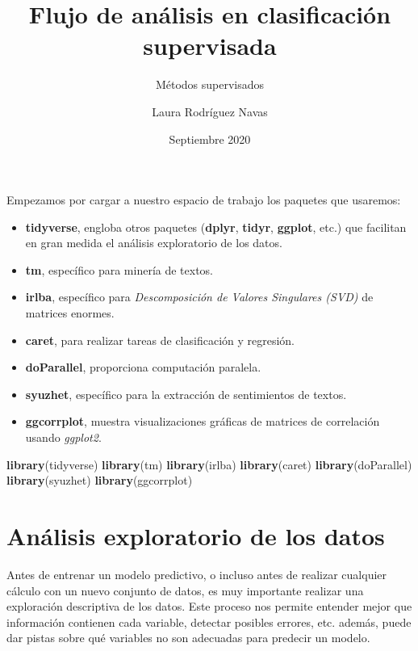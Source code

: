 \documentclass[]{article}
\title{Flujo de análisis en clasificación supervisada}
\subtitle{Métodos supervisados}
\author{Laura Rodríguez Navas}
\date{Septiembre 2020}
\newenvironment{Shaded}{\begin{snugshade}}{\end{snugshade}}
\newcommand{\KeywordTok}[1]{\textcolor[rgb]{0.13,0.29,0.53}{\textbf{#1}}}
\newcommand{\NormalTok}[1]{#1}
\providecommand{\tightlist}{%
  \setlength{\itemsep}{0pt}\setlength{\parskip}{0pt}}
\begin{document}
\maketitle

{
\setcounter{tocdepth}{2}
\renewcommand{\contentsname}{Contenido}
\tableofcontents
}
\newpage

Empezamos por cargar a nuestro espacio de trabajo los paquetes que
usaremos:

\begin{itemize}
\tightlist
\item
  \textbf{tidyverse}, engloba otros paquetes (\textbf{dplyr},
  \textbf{tidyr}, \textbf{ggplot}, etc.) que facilitan en gran medida el
  análisis exploratorio de los datos.
\item
  \textbf{tm}, específico para minería de textos.
\item
  \textbf{irlba}, específico para \emph{Descomposición de Valores
  Singulares (SVD)} de matrices enormes.
\item
  \textbf{caret}, para realizar tareas de clasificación y regresión.
\item
  \textbf{doParallel}, proporciona computación paralela.
\item
  \textbf{syuzhet}, específico para la extracción de sentimientos de
  textos.
\item
  \textbf{ggcorrplot}, muestra visualizaciones gráficas de matrices de
  correlación usando \emph{ggplot2}.
\end{itemize}

\begin{Shaded}
\begin{Highlighting}[]
\KeywordTok{library}\NormalTok{(tidyverse)}
\KeywordTok{library}\NormalTok{(tm)}
\KeywordTok{library}\NormalTok{(irlba)}
\KeywordTok{library}\NormalTok{(caret)}
\KeywordTok{library}\NormalTok{(doParallel)}
\KeywordTok{library}\NormalTok{(syuzhet)}
\KeywordTok{library}\NormalTok{(ggcorrplot)}
\end{Highlighting}
\end{Shaded}

\hypertarget{anuxe1lisis-exploratorio-de-los-datos}{%
\section{Análisis exploratorio de los
datos}\label{anuxe1lisis-exploratorio-de-los-datos}}

Antes de entrenar un modelo predictivo, o incluso antes de realizar
cualquier cálculo con un nuevo conjunto de datos, es muy importante
realizar una exploración descriptiva de los datos. Este proceso nos
permite entender mejor que información contienen cada variable, detectar
posibles errores, etc. además, puede dar pistas sobre qué variables no
son adecuadas para predecir un modelo.
\end{document}
